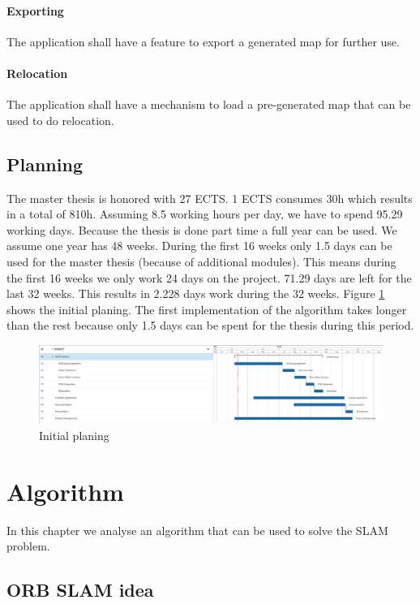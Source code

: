 \documentclass[11pt,a4paper,titlepage,oneside]{report}
\begin{document}
\subsubsection{Exporting}
The application shall have a feature to export a generated map for further use.
\subsubsection{Relocation}
The application shall have a mechanism to load a pre-generated map that can be used to do relocation.

\section{Planning}
The master thesis is honored with 27 ECTS. 1 ECTS consumes 30h which results in a total of 810h. Assuming 8.5 working hours per day, we have to spend 95.29 working days. Because the thesis is done part time a full year can be used. We assume one year has 48 weeks. During the first 16 weeks only 1.5 days can be used for the master thesis (because of additional modules). This means during the first 16 weeks we only work 24 days on the project. 71.29 days are left for the last 32 weeks. This results in 2.228 days work during the 32 weeks. Figure \ref{fig:gantt} shows the initial planing. The first implementation of the algorithm takes longer than the rest because only 1.5 days can be spent for the thesis during this period.

\begin{figure}[H]
	\includegraphics[width=1.0\textwidth]{img/gantt.png}
	\caption{Initial planing}\label{fig:gantt}
\end{figure}

\chapter{Algorithm}
In this chapter we analyse an algorithm that can be used to solve the SLAM problem.

\section{ORB SLAM idea}
\end{document}
